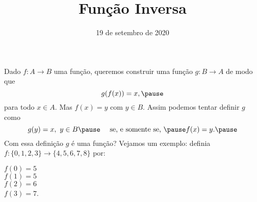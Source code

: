 \documentclass{beamer}
\title{Fun\c{c}\~ao Inversa}
\author[\autor]{\autor}
\institute[\instituto]{\instituto}
\date{19 de setembro de 2020}
\begin{document}
    \begin{frame}
        \maketitle
    \end{frame}


    \begin{frame}
        Dado $f : A \to B$ \pause uma fun\c{c}{\~a}o, \pause queremos construir uma fun\c{c}\~ao $g : B \to A$ \pause de modo que
        \[
            g(f(x)) = x,\pause
        \]
        para todo $x \in A$. \pause Mas $f(x) = y$ \pause com $y \in B$. \pause Assim podemos tentar definir $g$ \pause como
        \[
            g(y) = x,\ y \in B \pause \quad \mbox{ se, e somente se, } \pause f(x) = y.\pause
        \]
        Com essa defini\c{c}\~ao \pause $g$ \'e uma fun\c{c}\~ao? \pause Vejamos um exemplo: \pause definia $f : \{0,1,2,3\} \to \{4,5,6,7,8\}$ por:\pause
        \begin{center}
            $f(0) = 5$ \pause\\
            \vspace{.3cm}
            $f(1) = 5$\pause\\
            \vspace{.3cm}
            $f(2) = 6$\pause\\
            \vspace{.3cm}
            $f(3) = 7$.\pause
        \end{center}
    \end{frame}
\end{document}
